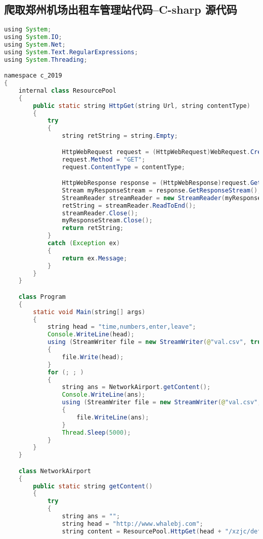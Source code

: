 \documentclass[withoutpreface,bwprint]{cumcmthesis} %
\begin{document}
\newpage
\begin{appendices}

	\section{爬取郑州机场出租车管理站代码--C-sharp 源代码}
	\begin{lstlisting}[language=java]
using System;
using System.IO;
using System.Net;
using System.Text.RegularExpressions;
using System.Threading;

namespace c_2019
{
    internal class ResourcePool
    {
        public static string HttpGet(string Url, string contentType)
        {
            try
            {
                string retString = string.Empty;

                HttpWebRequest request = (HttpWebRequest)WebRequest.Create(Url);
                request.Method = "GET";
                request.ContentType = contentType;

                HttpWebResponse response = (HttpWebResponse)request.GetResponse();
                Stream myResponseStream = response.GetResponseStream();
                StreamReader streamReader = new StreamReader(myResponseStream);
                retString = streamReader.ReadToEnd();
                streamReader.Close();
                myResponseStream.Close();
                return retString;
            }
            catch (Exception ex)
            {
                return ex.Message;
            }
        }
    }

    class Program
    {
        static void Main(string[] args)
        {
            string head = "time,numbers,enter,leave";
            Console.WriteLine(head);
            using (StreamWriter file = new StreamWriter(@"val.csv", true))
            {
                file.Write(head);
            }
            for (; ; )
            {
                string ans = NetworkAirport.getContent();
                Console.WriteLine(ans);
                using (StreamWriter file = new StreamWriter(@"val.csv", true))
                {
                    file.WriteLine(ans);
                }
                Thread.Sleep(5000);
            }
        }
    }

    class NetworkAirport
    {
        public static string getContent()
        {
            try
            {
                string ans = "";
                string head = "http://www.whalebj.com";
                string content = ResourcePool.HttpGet(head + "/xzjc/default.aspx", "");


\end{lstlisting}
\end{appendices}
\end{document}
